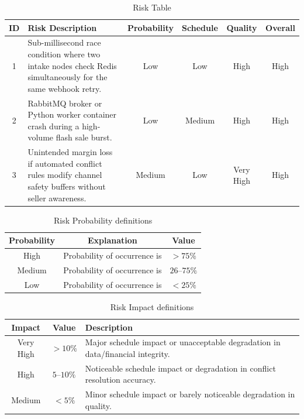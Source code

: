\documentclass[oneside,a4paper,12pt]{report}
\begin{document}
\begin{table}[!htbp]
\begin{center}
\renewcommand{\arraystretch}{1.35}
\begin{tabularx}{\textwidth}{|c|X|c|c|c|c|}
\hline
\textbf{ID} & \textbf{Risk Description} & \textbf{Probability} & \textbf{Schedule} & \textbf{Quality} & \textbf{Overall} \\ \hline
1 & Sub-millisecond race condition where two intake nodes check Redis simultaneously for the same webhook retry. & Low & Low & High & High \\ \hline
2 & RabbitMQ broker or Python worker container crash during a high-volume flash sale burst. & Low & Medium & High & High \\ \hline
3 & Unintended margin loss if automated conflict rules modify channel safety buffers without seller awareness. & Medium & Low & Very High & High \\ \hline
\end{tabularx}
\end{center}
\caption{Risk Table}
\label{tab:risk}
\end{table}

\begin{table}[!htbp]
\begin{center}
\renewcommand{\arraystretch}{1.35}
\begin{tabular}{|c|c|c|}
\hline
\textbf{Probability} & \textbf{Explanation} & \textbf{Value} \\ \hline
High & Probability of occurrence is & $> 75\%$ \\ \hline
Medium & Probability of occurrence is & $26\text{--}75\%$ \\ \hline
Low & Probability of occurrence is & $< 25\%$ \\ \hline
\end{tabular}
\end{center}
\caption{Risk Probability definitions \cite{bookPressman}}
\label{tab:riskdef}
\end{table}

\begin{table}[!htbp]
\begin{center}
\renewcommand{\arraystretch}{1.35}
\begin{tabularx}{\textwidth}{|c|c|X|}
\hline
\textbf{Impact} & \textbf{Value} & \textbf{Description} \\ \hline
Very High & $> 10\%$ & Major schedule impact or unacceptable degradation in data/financial integrity. \\ \hline
High & $5\text{--}10\%$ & Noticeable schedule impact or degradation in conflict resolution accuracy. \\ \hline
Medium & $< 5\%$ & Minor schedule impact or barely noticeable degradation in quality. \\ \hline
\end{tabularx}
\end{center}
\caption{Risk Impact definitions \cite{bookPressman}}
\label{tab:riskImpactDef}
\end{table}
\end{document}
